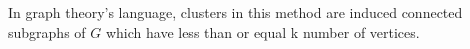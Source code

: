 \documentclass[12pt]{article}
\begin{document}
\begin{enumerate}
			In graph theory's language, clusters in this method are induced connected subgraphs of $G$ which have less than or equal k number of vertices. \\
			 	
			
			
	
				
	

\end{enumerate}
\end{document}
